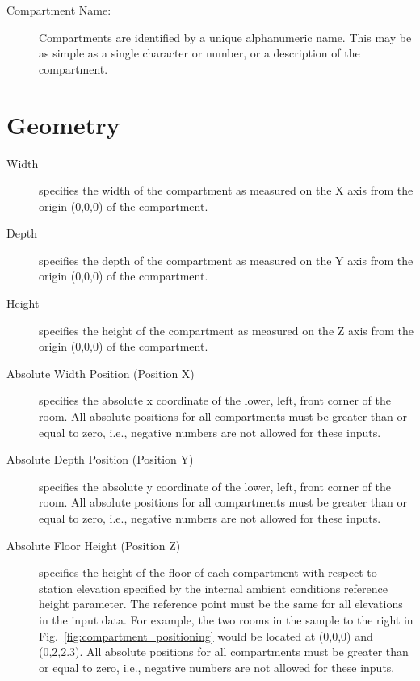\begin{description}
\item[Compartment Name:] Compartments are identified by a unique alphanumeric name.  This may be as simple as a single character or number, or a description of the compartment.
\end{description}




\section{Geometry}
\label{info:COMP}
\begin{description}
\item[Width] specifies the width of the compartment as measured on the X axis from the origin (0,0,0) of the compartment.

\item[Depth] specifies the depth of the compartment as measured on the Y axis from the origin (0,0,0) of the compartment.

\item[Height] specifies the height of the compartment as measured on the Z axis from the origin (0,0,0) of the compartment.

\item[Absolute Width Position (Position X)] specifies the absolute x coordinate of the lower, left, front corner of the room. All absolute positions for all compartments must be greater than or equal to zero, i.e., negative numbers are not allowed for these inputs.

\item[Absolute Depth Position (Position Y)] specifies the absolute y coordinate of the lower, left, front corner of the room. All absolute positions for all compartments must be greater than or equal to zero, i.e., negative numbers are not allowed for these inputs.

\item[Absolute Floor Height (Position Z)] specifies the height of the floor of each compartment with respect to station elevation specified by the internal ambient conditions reference height parameter.  The reference point must be the same for all elevations in the input data.  For example, the two rooms in the sample to the right in Fig.~\ref{fig:compartment_positioning} would be located at (0,0,0) and (0,2,2.3). All absolute positions for all compartments must be greater than or equal to zero, i.e., negative numbers are not allowed for these inputs.
\end{description}




